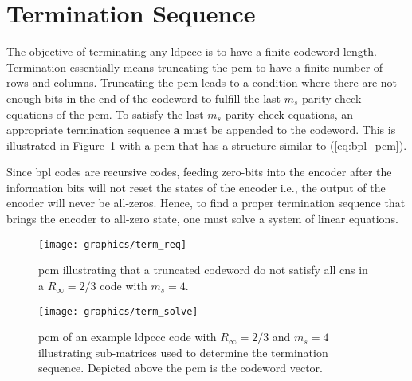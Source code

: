 \section{Termination Sequence}\label{sec:bpl_termi}
The objective of terminating any \gls{ldpccc} is to have a finite codeword length. Termination essentially means truncating the \gls{pcm} to have a finite number of rows and columns. Truncating the \gls{pcm} leads to a condition where there are not enough bits in the end of the codeword to fulfill the last $m_s$ parity-check equations of the \gls{pcm}. To satisfy the last $m_s$ parity-check equations, an appropriate termination sequence $\mathbf{a}$ must be appended to the codeword. This is illustrated in Figure~\ref{fig:term_req} with a \gls{pcm} that has a structure similar to (\ref{eq:bpl_pcm}).

Since \gls{bpl} codes are recursive codes, feeding zero-bits into the encoder after the information bits will not reset the states of the encoder i.e., the output of the encoder will never be all-zeros. Hence, to find a proper termination sequence that brings the encoder to all-zero state, one must solve a system of linear equations.

\begin{figure}[htbp]
  \centering
  \texttt{[image: graphics/term\_req]}
  \caption{\gls{pcm} illustrating that a truncated codeword do not satisfy all \glspl{cn} in a $R_\infty=2/3$ code with $m_s=4$.}
  \label{fig:term_req}
\end{figure}

\begin{figure}[htbp]
  \centering
  \texttt{[image: graphics/term\_solve]}
  \caption{\gls{pcm} of an example \gls{ldpccc} code with $R_\infty=2/3$ and $m_s=4$ illustrating sub-matrices used to determine the termination sequence. Depicted above the \gls{pcm} is the codeword vector.}
  \label{fig:bpl_term}
\end{figure}

